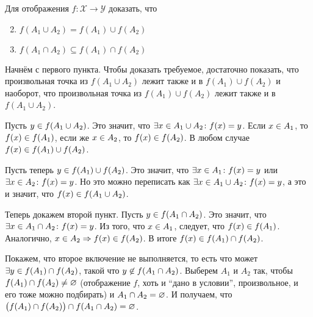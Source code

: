 \documentclass[a4paper,12pt]{article}
\begin{document}
  Для отображения $f\colon \mathcal X \to \mathcal Y$ доказать, что
  
  \begin{enumerate}
    \setcounter{enumi}{1}
    
    \item $f(A_1 \cup A_2) = f(A_1) \cup f(A_2)$
    
    \setcounter{enumi}{3}
    
    \item $f(A_1 \cap A_2) \subseteq f(A_1) \cap f(A_2)$
  \end{enumerate}
  
  \begin{solution}
    Начнём с первого пункта.
    Чтобы доказать требуемое, достаточно показать, что произвольная точка из $f(A_1 \cup A_2)$ лежит также и в $f(A_1) \cup f(A_2)$ и наоборот, что произвольная точка из $f(A_1) \cup f(A_2)$ лежит также и в $f(A_1 \cup A_2)$.
    
    Пусть $y \hm\in f(A_1 \cup A_2)$.
    Это значит, что $\exists x \hm\in A_1 \hm\cup A_2\colon f(x) \hm= y$.
    Если $x \hm\in A_1$, то $f(x) \hm\in f(A_1)$, если же $x \hm\in A_2$, то $f(x) \hm\in f(A_2)$.
    В любом случае $f(x) \hm\in f(A_1) \hm\cup f(A_2)$.
    
    Пусть теперь $y \hm\in f(A_1) \hm\cup f(A_2)$.
    Это значит, что $\exists x \hm\in A_1\colon f(x) \hm= y$ или $\exists x \hm\in A_2\colon f(x) \hm= y$.
    Но это можно переписать как $\exists x \hm\in A_1 \hm\cup A_2\colon f(x) \hm= y$, а это и значит, что $f(x) \hm\in f(A_1 \cup A_2)$.
    
    \bigskip
    
    Теперь докажем второй пункт.
    Пусть $y \hm\in f(A_1 \cap A_2)$.
    Это значит, что $\exists x \hm\in A_1 \hm\cap A_2\colon f(x) \hm= y$.
    Из того, что $x \hm\in A_1$, следует, что $f(x) \hm\in f(A_1)$.
    Аналогично, $x \hm\in A_2 \hm\Rightarrow f(x) \hm\in f(A_2)$.
    В итоге $f(x) \hm\in f(A_1) \hm\cap f(A_2)$.
    
    Покажем, что второе включение не выполняется, то есть что может $\exists y \hm\in f(A_1) \hm\cap f(A_2)$, такой что $y \hm{\not\in} f(A_1 \cap A_2)$.
    Выберем $A_1$ и $A_2$ так, чтобы $f(A_1) \hm\cap f(A_2) \hm{\not=} \noth$ (отображение $f$, хоть и ``дано в условии'', произвольное, и его тоже можно подбирать) и $A_1 \hm\cap A_2 \hm= \noth$.
    И получаем, что $\bigl(f(A_1) \hm\cap f(A_2)\bigr) \hm\cap f(A_1 \cap A_2) \hm= \noth$.
  \end{solution}
  
\end{document}
